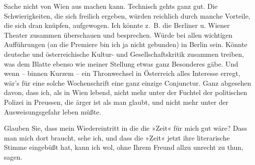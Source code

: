                Sache nicht von Wien aus machen kann. Technisch
               gehts ganz gut. Die Schwierigkeiten, die sich freilich ergeben, würden reichlich
               durch manche Vorteile, {\pb}die
               sich dran knüpfen, aufgewogen. Ich könnte z. B. die Berliner u. Wiener Theater zusammen
               überschauen und besprechen. Würde bei allen wichtigen Aufführungen (an die Premiere
               bin ich ja nicht gebunden) in Berlin sein. Könnte
                  deutsche und österreichische Kultur- und
               Gesellschaftskritik zusammen treiben, was dem Blatte ebenso wie meiner Stellung etwas ganz Besonderes gäbe. Und wenn – binnen Kurzem
               – ein Thronwechsel in Österreich alles
               Interesse erregt, wär’s für eine solche Wochenschrift eine ganz einzige Conjunctur.
               Ganz abgesehen davon, dass ich, als in Wien
               lebend, nicht mehr unter der Fuchtel der politischen Polizei in Preussen, die ärger ist als man glaubt, und nicht mehr unter
               der Ausweisungsgefahr leben müßte.\pend
           
\pstart
           Glauben Sie, dass mein Wiedereintritt in die die »Zeit« für mich gut wäre? Dass man mich dort braucht, sehe ich, und dass die
                  »Zeit« jetzt ihre literarische Stimme
               eingebüßt hat, kann ich wol, ohne Ihrem Freund \label{K_L03430-5v}\label{K_L03430-5} allzu unrecht zu thun, sagen.\pend
           
